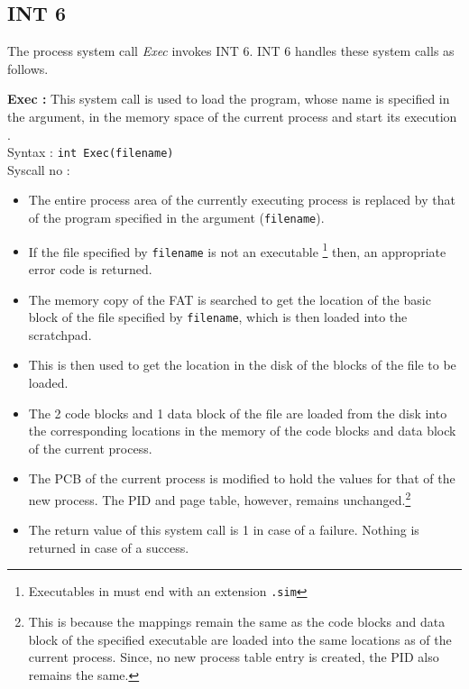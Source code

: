 \subsection{INT 6}
The process system call \textit{Exec} invokes INT 6. INT 6 handles these system calls as follows.

\textbf{Exec :}  This system call is used to load the program, whose name is specified in the argument, in the memory space of the current process and start its execution .\\
Syntax : \texttt{int Exec(filename)} \\
Syscall no : 
\begin{itemize}
	\item The entire process area of the currently executing process is replaced by that of the program specified in the argument (\texttt{filename}). 
	\item If the file specified by \texttt{filename} is not an executable \footnote{Executables in {\ESIM} must end with an extension \texttt{.sim}} then, an appropriate error code is returned.
	\item The memory copy of the FAT  is searched to get the location of the basic block of the file specified by \texttt{filename}, which is then loaded into the scratchpad.
	\item This is then used to get the location in the disk of the blocks of the file to be loaded.
	\item The 2 code blocks and 1 data block of the file are loaded from the disk into the corresponding locations in the memory of the code blocks and data block of the current process.
	\item The PCB of the current process is modified to hold the values for that of the new process. The PID and page table, however, remains unchanged.\footnote{This is because the mappings remain the same as the code blocks and data block of the specified executable are loaded into the same locations as of the current process. Since, no new process table entry is created, the PID also remains the same.}
	\item The return value of this system call is 1 in case of a failure. Nothing is returned in case of a success.
\end{itemize}

